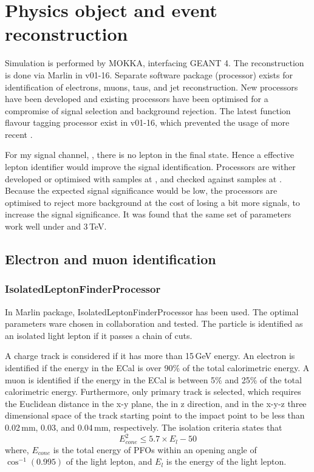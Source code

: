 \section{Physics object and event reconstruction}

Simulation is performed by MOKKA, interfacing GEANT 4.
The reconstruction is done via Marlin in \ilcsoft v01-16. Separate software package (processor) exists for identification of electrons, muons, taus, and jet reconstruction. New processors have been developed and existing processors have been optimised for a compromise of signal selection and background rejection. The latest function flavour tagging processor exist in \ilcsoft v01-16, which prevented the usage of more recent \ilcsoft.


For my signal channel, \eeToHHbbWW, there is no lepton in the final state. Hence a effective lepton identifier would improve the signal identification. Processors are wither developed or optimised with samples at , and checked against samples at . Because the expected signal significance would be low, the processors are optimised to reject more background at the cost of losing a bit more signals, to increase the signal significance. It was found that the same set of parameters work well under  and 3\,TeV.



\subsection{Electron and muon identification}
\label{sec:doubleHiggsLeptonID}


\subsubsection{IsolatedLeptonFinderProcessor}

In Marlin package, IsolatedLeptonFinderProcessor has been used. The optimal parameters ware chosen in collaboration and tested. The particle is identified as an isolated light lepton if it passes a chain of cuts.

A charge track is considered if it has more than 15\,GeV energy. An electron is identified if the energy in the ECal is over 90\% of the total calorimetric energy. A muon is identified if the energy in the ECal is between 5\% and 25\% of the total calorimetric energy. Furthermore, only primary track is selected, which requires the Euclidean distance in the x-y plane, the in z direction, and in the x-y-z three dimensional space of the track starting point to the impact point to be less than 0.02\,mm, 0.03\mm, and  0.04\,mm, respectively. The isolation criteria states that
\begin{equation}
E_{cone}^2 \leqslant 5.7 \times E_{l} - 50
\end{equation}
where, $E_{cone}$ is the total energy of PFOs within an opening angle of $\cos^{-1}(0.995)$ of the light lepton, and $E_{l}$ is the energy of the light lepton.

